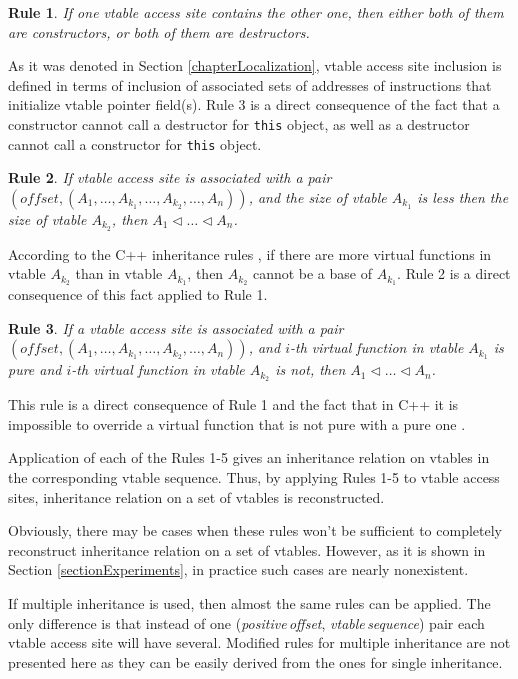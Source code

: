 \documentclass[times, 10pt,twocolumn]{article}
\newtheorem{rulez}{Rule}
\newcommand{\offset}{\textit{offset}}
\newcommand{\vtable}{\textit{vtable}}
\newcommand{\positive}{\textit{positive}}
\newcommand{\sequence}{\textit{sequence}}
\renewcommand{\~}{{\raise.35ex\hbox{$\scriptstyle\sim$}}}
\begin{document}
\begin{rulez}
If one vtable access site contains the other one, then either both of them are
constructors, or both of them are destructors.
\end{rulez}

As it was denoted in Section \ref{chapterLocalization}, vtable access site
inclusion is defined in terms of inclusion of associated sets of addresses
of instructions that initialize vtable pointer field(s).
Rule 3 is a direct consequence of the fact that a constructor cannot call
a destructor for \lstinline{this} object, as well as a destructor cannot
call a constructor for \lstinline{this} object.

\begin{rulez}
If vtable access site is associated with a pair
$(\offset, (A_1, \ldots, A_{k_1}, \ldots, A_{k_2}, \ldots, A_n))$, and the size of vtable
$A_{k_1}$ is less then the size of vtable $A_{k_2}$, then $A_1 \lhd \ldots \lhd A_n$.
\end{rulez}

According to the C++ inheritance rules \cite{cpp03},
if there are more virtual functions in vtable $A_{k_2}$ than in vtable $A_{k_1}$,
then $A_{k_2}$ cannot be a base of $A_{k_1}$. Rule 2 is a direct consequence of this fact
applied to Rule 1.

\begin{rulez}
If a vtable access site is associated with a pair
$(\offset, (A_1, \ldots, A_{k_1}, \ldots, A_{k_2}, \ldots, A_n))$, and $i$-th virtual function
in vtable $A_{k_1}$ is pure and $i$-th virtual function in vtable $A_{k_2}$ is not,
then $A_1 \lhd \ldots \lhd A_n$.
\end{rulez}

This rule is a direct consequence of Rule 1 and the fact that in C++ it is impossible to
override a virtual function that is not pure with a pure one \cite{cpp03}.

Application of each of the Rules 1-5 gives an inheritance
relation on vtables in the corresponding vtable sequence.
Thus, by applying Rules 1-5 to vtable access sites,
inheritance relation on a set of vtables is reconstructed.

Obviously, there may be cases when these rules won't
be sufficient to completely reconstruct inheritance
relation on a set of vtables. However, as it is shown
in Section \ref{sectionExperiments}, in practice
such cases are nearly nonexistent.

If multiple inheritance is used, then almost the same rules can be applied.
The only difference is that instead of one
(\positive\,\offset, \vtable\,\sequence) pair
each vtable access site will have several.
Modified rules for multiple inheritance are not
presented here as they can be easily derived
from the ones for single inheritance.
\end{document}
